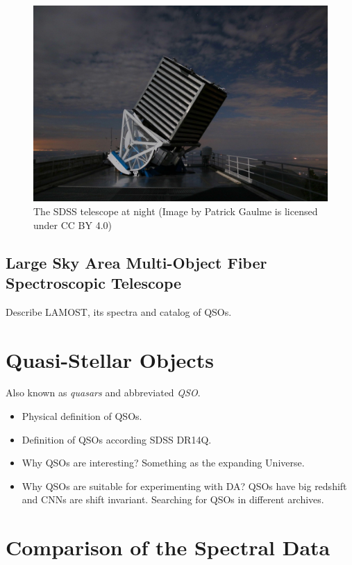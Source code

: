 \documentclass[thesis=M,english]{FITthesis}[2012/10/20]
\begin{document}
\begin{figure}
	\includegraphics[width=\textwidth]{img/sdss_gaulme.jpg}
	\caption{The SDSS telescope at night (Image by Patrick Gaulme is licensed under CC BY 4.0)}
	\label{solar_spectrum}
\end{figure}

\subsection{Large Sky Area Multi-Object Fiber Spectroscopic Telescope}

Describe LAMOST, its spectra and catalog of QSOs.

\section{Quasi-Stellar Objects}

Also known as \textit{quasars} and abbreviated \textit{QSO}.

\begin{itemize}
	\item Physical definition of QSOs.
	\item Definition of QSOs according SDSS DR14Q.
	\item Why QSOs are interesting? Something as the expanding Universe.
	\item Why QSOs are suitable for experimenting with DA?
		QSOs have big redshift and CNNs are shift invariant.
		Searching for QSOs in different archives.
\end{itemize}

\section{Comparison of the Spectral Data}
\end{document}
